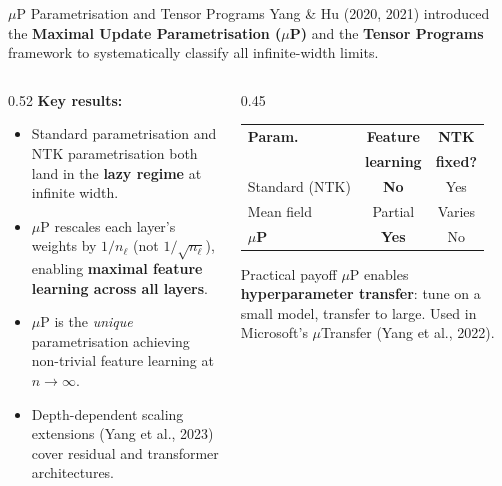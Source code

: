 \documentclass[aspectratio=169, 10pt]{beamer}
\newcommand{\highlight}[1]{\textcolor{blue!70!black}{\textbf{#1}}}
\newcommand{\myalert}[1]{\textcolor{red!70!black}{\textbf{#1}}}
\begin{document}
\begin{frame}{$\mu$P Parametrisation and Tensor Programs}
  Yang \& Hu (2020, 2021) introduced the \textbf{Maximal Update Parametrisation ($\mu$P)} and the
  \textbf{Tensor Programs} framework to systematically classify all infinite-width limits.

  \vspace{0.4em}
  \begin{columns}[T]
    \begin{column}{0.52\textwidth}
      \textbf{Key results:}
      \begin{itemize}
        \item Standard parametrisation and NTK parametrisation both land in the \myalert{lazy regime} at infinite width.
        \item $\mu$P rescales each layer's weights by $1/n_\ell$ (not $1/\sqrt{n_\ell}$), enabling \highlight{maximal feature learning across all layers}.
        \item $\mu$P is the \emph{unique} parametrisation achieving non-trivial feature learning at $n\to\infty$.
        \item Depth-dependent scaling extensions (Yang et al., 2023) cover residual and transformer architectures.
      \end{itemize}
    \end{column}
    \begin{column}{0.45\textwidth}
      \renewcommand{\arraystretch}{1.3}
      \begin{tabular}{lcc}
        \toprule
        \textbf{Param.} & \textbf{Feature} & \textbf{NTK} \\
                        & \textbf{learning} & \textbf{fixed?} \\
        \midrule
        Standard (NTK) & \myalert{No} & Yes \\
        Mean field & Partial & Varies \\
        \highlight{$\mu$P} & \highlight{Yes} & No \\
        \bottomrule
      \end{tabular}

      \vspace{0.5em}
      \begin{block}{\small Practical payoff}
        $\mu$P enables \textbf{hyperparameter transfer}: tune on a small model, transfer to large. Used in Microsoft's $\mu$Transfer (Yang et al., 2022).
      \end{block}
    \end{column}
  \end{columns}
\end{frame}
\end{document}

